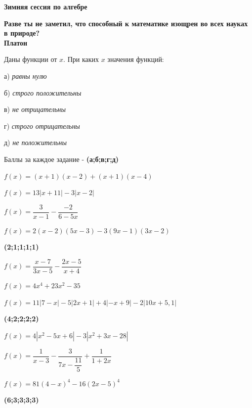 \centerline{\bf \Huge Зимняя сессия по алгебре }

\begin{flushright}
        \scriptsize{\textbf{Разве ты не заметил, что способный к математике изощрен во всех науках в природе?\\
         Платон}}
        
\end{flushright}



Даны функции от \textbf{$x$}. При каких \textbf{$x$} значения функций:

а) \textit{равны нулю}

б) \textit{строго положительны}

в) \textit{не отрицательны}

г) \textit{строго отрицательны}

д) \textit{не положительны}

Баллы за каждое задание - \textbf{(а;б;в;г;д)}

 $f(x)=(x+1)(x-2)+(x+1)(x-4)$

 $f(x)=13|x+11|-3|x-2|$

 $f(x)=\dfrac{3}{x-1}-\dfrac{-2}{6-5x}$

 $f(x)=2(x-2)(5x-3)-3(9x-1)(3x-2)$

\begin{flushright} \textbf{(2;1;1;1;1)}\\ 
\end{flushright}

 $f(x)=\dfrac{x-7}{3x-5}-\dfrac{2x-5}{x+4}$

 $f(x)=4x^4+23x^2-35$

 $f(x)=11|7-x|-5|2x+1|+4|-x+9|-2|10x+5,1|$

\begin{flushright} \textbf{(4;2;2;2;2)}\\ 
\end{flushright}




 $f(x)=4|x^2-5x+6|-3|x^2+3x-28|$

 $f(x)=\dfrac{1}{x-3}-\dfrac{3}{7x-\dfrac{11}{5}}+\dfrac{1}{1+2x}$

 $f(x)=81(4-x)^4-16(2x-5)^4$

\begin{flushright} \textbf{(6;3;3;3;3)}\\ 
\end{flushright}

